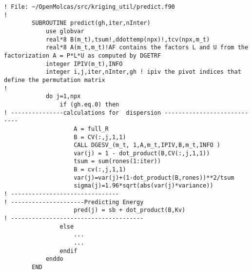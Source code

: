\documentclass[aps,prb,twocolumn,superscriptaddress,floatfix,longbibliography,10pt]{revtex4-2}
\begin{document}
\begin{lstlisting}[caption={(Code: 3)}, title={Code: 3. Predicting Energy}, label=code.predE]
! File: ~/OpenMolcas/src/kriging_util/predict.f90
!
        SUBROUTINE predict(gh,iter,nInter)
            use globvar
            real*8 B(m_t),tsum!,ddottemp(npx)!,tcv(npx,m_t)
            real*8 A(m_t,m_t)!AF contains the factors L and U from the factorization A = P*L*U as computed by DGETRF
            integer IPIV(m_t),INFO
            integer i,j,iter,nInter,gh ! ipiv the pivot indices that define the permutation matrix
!
            do j=1,npx
                if (gh.eq.0) then
! ---------------calculations for  dispersion ----------------------------
                    A = full_R
                    B = CV(:,j,1,1)
                    CALL DGESV_(m_t, 1,A,m_t,IPIV,B,m_t,INFO )
                    var(j) = 1 - dot_product(B,CV(:,j,1,1))
                    tsum = sum(rones(1:iter))
                    B = cv(:,j,1,1)
                    var(j)=var(j)+(1-dot_product(B,rones))**2/tsum
                    sigma(j)=1.96*sqrt(abs(var(j)*variance))
! -------------------------------
! ---------------------Predicting Energy
                    pred(j) = sb + dot_product(B,Kv)
! --------------------------------------
                else
					...
					...
                endif
            enddo
        END
\end{lstlisting}
\end{document}
